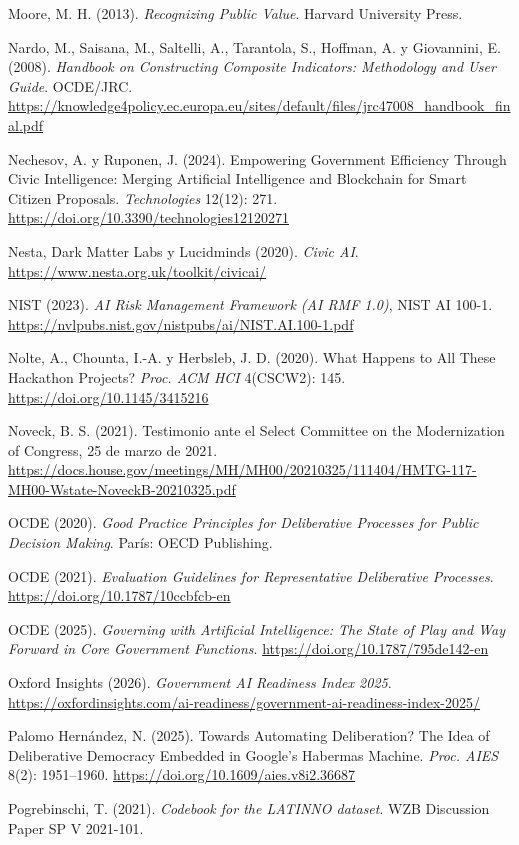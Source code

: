 \documentclass[11pt,a4paper]{article}
\begin{document}
Moore, M. H. (2013). \emph{Recognizing Public Value}. Harvard University Press.

Nardo, M., Saisana, M., Saltelli, A., Tarantola, S., Hoffman, A. y Giovannini, E. (2008). \emph{Handbook on Constructing Composite Indicators: Methodology and User Guide}. OCDE/JRC. \url{https://knowledge4policy.ec.europa.eu/sites/default/files/jrc47008_handbook_final.pdf}

Nechesov, A. y Ruponen, J. (2024). Empowering Government Efficiency Through Civic Intelligence: Merging Artificial Intelligence and Blockchain for Smart Citizen Proposals. \emph{Technologies} 12(12): 271. \url{https://doi.org/10.3390/technologies12120271}

Nesta, Dark Matter Labs y Lucidminds (2020). \emph{Civic AI}. \url{https://www.nesta.org.uk/toolkit/civicai/}

NIST (2023). \emph{AI Risk Management Framework (AI RMF 1.0)}, NIST AI 100-1. \url{https://nvlpubs.nist.gov/nistpubs/ai/NIST.AI.100-1.pdf}

Nolte, A., Chounta, I.-A. y Herbsleb, J. D. (2020). What Happens to All These Hackathon Projects? \emph{Proc. ACM HCI} 4(CSCW2): 145. \url{https://doi.org/10.1145/3415216}

Noveck, B. S. (2021). Testimonio ante el Select Committee on the Modernization of Congress, 25 de marzo de 2021. \url{https://docs.house.gov/meetings/MH/MH00/20210325/111404/HMTG-117-MH00-Wstate-NoveckB-20210325.pdf}

OCDE (2020). \emph{Good Practice Principles for Deliberative Processes for Public Decision Making}. París: OECD Publishing.

OCDE (2021). \emph{Evaluation Guidelines for Representative Deliberative Processes}. \url{https://doi.org/10.1787/10ccbfcb-en}

OCDE (2025). \emph{Governing with Artificial Intelligence: The State of Play and Way Forward in Core Government Functions}. \url{https://doi.org/10.1787/795de142-en}

Oxford Insights (2026). \emph{Government AI Readiness Index 2025}. \url{https://oxfordinsights.com/ai-readiness/government-ai-readiness-index-2025/}

Palomo Hernández, N. (2025). Towards Automating Deliberation? The Idea of Deliberative Democracy Embedded in Google's Habermas Machine. \emph{Proc. AIES} 8(2): 1951--1960. \url{https://doi.org/10.1609/aies.v8i2.36687}

Pogrebinschi, T. (2021). \emph{Codebook for the LATINNO dataset}. WZB Discussion Paper SP V 2021-101.
\end{document}
